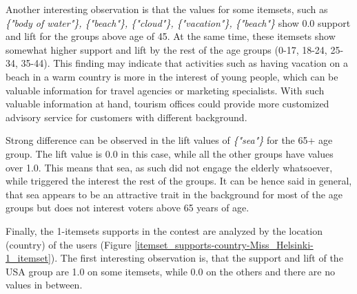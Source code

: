 Another interesting observation is that the values for some itemsets, such as \emph{\{"body of water"\}, \{"beach"\}, \{"cloud"\}, \{"vacation"\}, \{"beach"\}} show 0.0 support and lift for the groups above age of 45. At the same time, these itemsets show somewhat higher support and lift by the rest of the age groups (0-17, 18-24, 25-34, 35-44). This finding may indicate that activities such as having vacation on a beach in a warm country is more in the interest of young people, which can be valuable information for travel agencies or marketing specialists. With such valuable information at hand, tourism offices could provide more customized advisory service for customers with different background. 

Strong difference can be observed in the lift values of \emph{\{"sea"\}} for the 65+ age group. The lift value is 0.0 in this case, while all the other groups have values over 1.0. This means that sea, as such did not engage the elderly whatsoever, while triggered the interest the rest of the groups. It can be hence said in general, that sea appears to be an attractive trait in the background for most of the age groups but does not interest voters above 65 years of age. 


Finally, the 1-itemsets supports in the contest are analyzed by the location (country) of the users (Figure \ref{itemset_supports-country-Miss_Helsinki-1_itemset}). The first interesting observation is, that the support and lift of the USA group are 1.0 on some itemsets, while 0.0 on the others and there are no values in between. 

